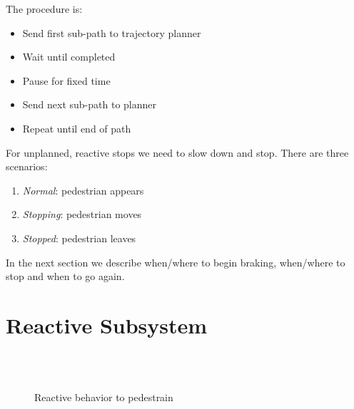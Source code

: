 \documentclass[letterpaper, 10 pt, conference]{ieeeconf}  %
\begin{document}
The procedure is:
\begin{itemize}
\item Send first sub-path to trajectory planner
\item Wait until completed
\item Pause for fixed time
\item Send next sub-path to planner
\item Repeat until end of path
\end{itemize}

For unplanned, reactive stops  we need to slow down and stop. 
There are three scenarios:
\begin{enumerate}
\item \emph{Normal}: pedestrian appears
\item \emph{Stopping}: pedestrian moves
\item \emph{Stopped}: pedestrian leaves
\end{enumerate}

In the next section we describe when/where to begin braking, when/where to stop
and when to go again.

\section{Reactive Subsystem} \label{sec:reactiveubsystem}

\begin{figure}[thpb]
\centering
  \\
  \\
  \caption{Reactive behavior to pedestrain}
  \label{fig:react}
\end{figure}
\end{document}
